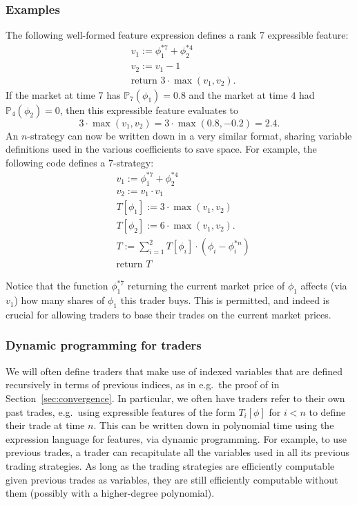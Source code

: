 \documentclass[authordate,onecolumn,noenvironments]{miri-tech-article}
\numberwithin{equation}{subsection}
\newcommand{\nn}{n}
\newcommand{\trade}{T}%
\newcommand{\strat}{T} %
\newcommand{\BelState}{\mathbb{P}}
\newcommand{\pt}{\BelState}
\newcommand{\returntrade}{\textrm{return }}
\begin{document}
\subsubsection{Examples}
The following well-formed feature expression defines a rank 7 expressible feature:
%
\begin{align*}
&v_1 := \phi_1^{* 7} + \phi_2^{* 4}\\
&v_2 := v_1 - 1\\
&\returntrade 3\cdot \max(v_1,v_2).
\end{align*}
%
If the market at time 7 has $\pt_7(\phi_1)= 0.8$ and the market at time $4$ had $\pt_4(\phi_2)=0$, then this expressible feature evaluates to 
%
\[3\cdot \max(v_1,v_2) = 3\cdot \max(0.8,-0.2) = 2.4.\]
%
An $\nn$-strategy can now be written down in a very similar format, sharing variable definitions used in the various coefficients to save space.  For example, the following code defines a $7$-strategy:
%
\begin{align*}
&v_1 := \phi_1^{* 7} + \phi_2^{* 4}\\
&v_2 := v_1 \cdot v_1\\
&\strat[\phi_1] := 3\cdot \max(v_1,v_2)\\
&\strat[\phi_2] := 6 \cdot \max(v_1,v_2).\\
&\strat := \sum_{i=1}^2 T[\phi_i]\cdot(\phi_i-\phi_i^{*\nn})\\
&\returntrade T
\end{align*}

Notice that the function $\phi_1^{*7}$ returning the current market price of $\phi_1$ affects (via $v_1$) how many shares of $\phi_1$ this trader buys.  This is permitted, and indeed is crucial for allowing traders to base their trades on the current market prices. 

\subsubsection{Dynamic programming for traders}\label{app:dynamicprogramming}

We will often define traders that make use of indexed variables that are defined recursively in terms of previous indices, as in e.g.\ the proof of  in Section~\ref{sec:convergence}. In particular, we often have traders refer to their own past trades, e.g.\ using  expressible features of the form  $\trade_i[\phi]$ for $i<\nn$ to define their trade at time $\nn$. This can be written down in polynomial time using the expression language for features, via dynamic programming. For example, to use previous trades, a trader can recapitulate all the variables used in all its previous trading strategies. As long as the trading strategies are efficiently computable given previous trades as variables, they are still efficiently computable without them (possibly with a higher-degree polynomial).
\end{document}
